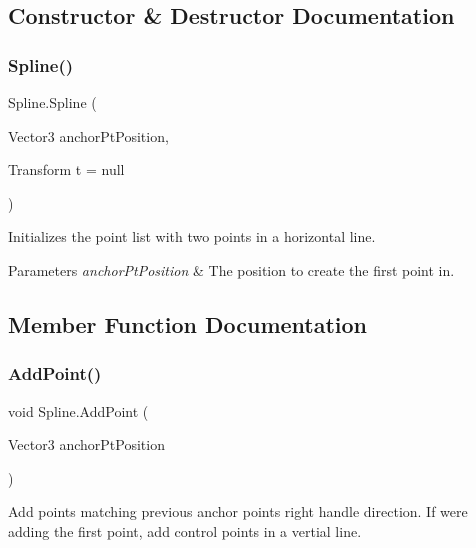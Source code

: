 \subsection{Constructor \& Destructor Documentation}
\mbox{\label{class_spline_ad81797f1f2c52c431f16c75f53370175}} 
\subsubsection{\texorpdfstring{Spline()}{Spline()}}
{\footnotesize\ttfamily Spline.\+Spline (\begin{DoxyParamCaption}\item[{Vector3}]{anchor\+Pt\+Position,  }\item[{Transform}]{t = {\ttfamily null} }\end{DoxyParamCaption})}



Initializes the point list with two points in a horizontal line. 


\begin{DoxyParams}{Parameters}
{\em anchor\+Pt\+Position} & The position to create the first point in. \\
\hline
\end{DoxyParams}


\subsection{Member Function Documentation}
\mbox{\label{class_spline_a57e6ce88b2b1d1362651dff09b6ef2c8}} 
\subsubsection{\texorpdfstring{Add\+Point()}{AddPoint()}}
{\footnotesize\ttfamily void Spline.\+Add\+Point (\begin{DoxyParamCaption}\item[{Vector3}]{anchor\+Pt\+Position }\end{DoxyParamCaption})}



Add points matching previous anchor point\textquotesingle{}s right handle direction. If we\textquotesingle{}re adding the first point, add control points in a vertial line. 


